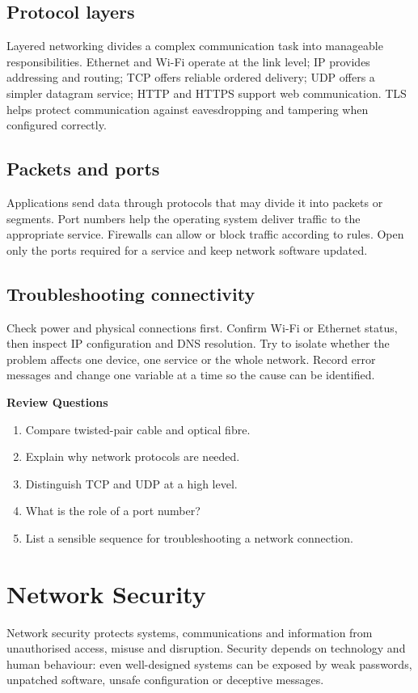 \documentclass[11pt,openany,oneside]{book}
\newcommand{\reviewtitle}{\par\noindent\textbf{\color{Navy}Review Questions}\par}
\begin{document}
\section{Protocol layers}
Layered networking divides a complex communication task into manageable responsibilities. Ethernet and Wi-Fi operate at the link level; IP provides addressing and routing; TCP offers reliable ordered delivery; UDP offers a simpler datagram service; HTTP and HTTPS support web communication. TLS helps protect communication against eavesdropping and tampering when configured correctly.

\section{Packets and ports}
Applications send data through protocols that may divide it into packets or segments. Port numbers help the operating system deliver traffic to the appropriate service. Firewalls can allow or block traffic according to rules. Open only the ports required for a service and keep network software updated.

\section{Troubleshooting connectivity}
Check power and physical connections first. Confirm Wi-Fi or Ethernet status, then inspect IP configuration and DNS resolution. Try to isolate whether the problem affects one device, one service or the whole network. Record error messages and change one variable at a time so the cause can be identified.

\reviewtitle
\begin{enumerate}
\item Compare twisted-pair cable and optical fibre.
\item Explain why network protocols are needed.
\item Distinguish TCP and UDP at a high level.
\item What is the role of a port number?
\item List a sensible sequence for troubleshooting a network connection.
\end{enumerate}

\chapter{Network Security}
Network security protects systems, communications and information from unauthorised access, misuse and disruption. Security depends on technology and human behaviour: even well-designed systems can be exposed by weak passwords, unpatched software, unsafe configuration or deceptive messages.
\end{document}
